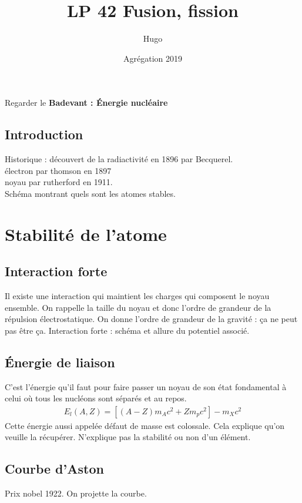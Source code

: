 \documentclass[12pt,prb,aps,epsf]{article}
\begin{document}
	
	\title{LP 42 Fusion, fission}
	\author{Hugo}
	\date{Agrégation 2019}

	\maketitle
	
	\tableofcontents
	
	\pagebreak

Regarder le \textbf{Badevant : Énergie nucléaire}

\subsection{Introduction}
Historique : découvert de la radiactivité en 1896 par Becquerel.\\
électron par thomson en 1897\\
noyau par rutherford en 1911.\\

Schéma montrant quels sont les atomes stables.
	
\section{Stabilité de l'atome}
\subsection{Interaction forte}
Il existe une interaction qui maintient les charges qui composent le noyau ensemble. On rappelle la taille du noyau et donc l'ordre de grandeur de la répulsion électrostatique. On donne l'ordre de grandeur de la gravité : ça ne peut pas être ça. Interaction forte : schéma et allure du potentiel associé.

\subsection{Énergie de liaison}
C'est l'énergie qu'il faut pour faire passer un noyau de son état fondamental à celui où tous les nucléons sont séparés et au repos.
\begin{eqnarray}
E_l(A, Z) = [(A-Z)m_A c^2 + Zm_p c^2] - m_X c^2
\end{eqnarray}
Cette énergie aussi appelée défaut de masse est colossale. Cela explique qu'on veuille la récupérer. N'explique pas la stabilité ou non d'un élément.

\subsection{Courbe d'Aston}
Prix nobel 1922. On projette la courbe.\\
\end{document}
